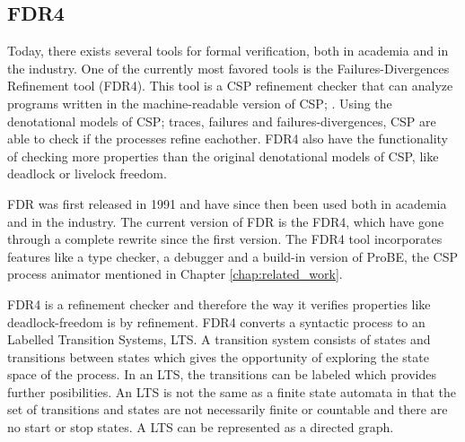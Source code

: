 \subsection{FDR4}
Today, there exists several tools for formal verification, both in academia and in the industry. One of the currently most favored tools is the Failures-Divergences Refinement tool (FDR4). This tool is a CSP refinement checker that can analyze programs written in the machine-readable version of CSP; \cspm{}.
Using the denotational models of CSP; traces, failures and failures-divergences, CSP are able to check if the processes refine eachother. FDR4 also have the functionality of checking more properties than the original denotational models of CSP, like deadlock or livelock freedom.

FDR was first released in 1991 and have since then been used both in academia and in the industry. The current version of FDR is the FDR4, which have gone through a complete rewrite since the first version.
The FDR4 tool incorporates features like a \cspm{} type checker, a debugger and a build-in version of ProBE, the CSP process animator mentioned in Chapter \ref{chap:related_work}.

FDR4 is a refinement checker and therefore the way it verifies properties like deadlock-freedom is by refinement. FDR4 converts a syntactic process to an Labelled Transition Systems, LTS. A transition system consists of states and transitions between states which gives the opportunity of exploring the state space of the process. In an LTS, the transitions can be labeled which provides further posibilities. An LTS is not the same as a finite state automata in that the set of transitions and states are not necessarily finite or countable and there are no start or stop states. A LTS can be represented as a directed graph.

